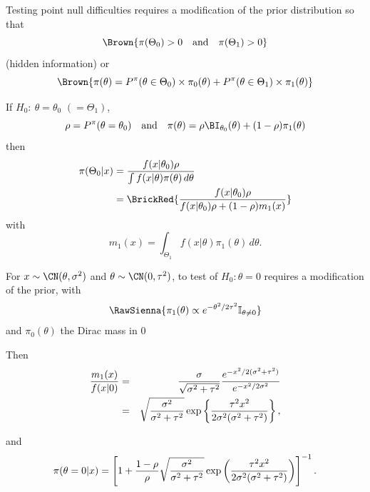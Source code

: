 \begin{slide}
\end{slide}\begin{slide}

Testing point null difficulties requires a modification of the prior distribution
so that 
$$\Brown{
\pi(\Theta_0)>0 \quad\hbox{and}\quad \pi(\Theta_1)>0
}$$
(hidden information) or
$$\Brown{
\pi(\theta) = P^\pi (\theta\in\Theta_0)\times\pi_0(\theta) +
                P^\pi (\theta\in\Theta_1)\times\pi_1(\theta)
}$$


\pause
{}

\end{slide}\begin{slide}

If $H_0: \ \theta=\theta_0$ $(=\Theta_1)$, 
$$
\rho = P^\pi (\theta=\theta_0) \quad\hbox{and}\quad
\pi(\theta) = \rho \BI_{\theta_0}(\theta)+ (1-\rho) \pi_1(\theta)
$$
then
\begin{align*}
\pi(\Theta_0|x) &= {f(x|\theta_0)\rho \over 
		\int f(x|\theta)\pi(\theta)\,d\theta} \\
 &= \BrickRed{{f(x|\theta_0)\rho \over f(x|\theta_0)\rho + (1-\rho) m_1(x)}}
\end{align*}
with
$$
m_1(x)=\int_{\Theta_1} f(x|\theta)\pi_1(\theta)\,d\theta.
$$

\end{slide}\begin{slide}
 For $x\sim \CN(\theta,\sigma^2)$ and $\theta\sim\CN(0,\tau^2)$,
to test of $H_0:\theta=0$ requires a modification of the prior, with
$$\RawSienna{
\pi_1(\theta) \propto e^{-\theta^2/2\tau^2} \mathbb{I}_{\theta\ne 0}
}$$
and $\pi_0(\theta)$ the Dirac mass in $0$

\pause
Then
\begin{eqnarray*}
{m_1(x)\over f(x|0)} &=&  {\sigma\over \sqrt{\sigma^2+\tau^2}}
	{e^{-x^2/2(\sigma^2+\tau^2)} \over e^{-x^2/2\sigma^2}} \\
      &=&  \sqrt{{\sigma^2\over\sigma^2+\tau^2}} \exp\left\{
	   {\tau^2x^2\over 2\sigma^2(\sigma^2+\tau^2)} \right\}, 
\end{eqnarray*}
\fin

\end{slide}\begin{slide}
\debut[cont'd]
and
$$
\pi(\theta=0|x) = \left[ 1+{1-\rho\over \rho} \sqrt{{\sigma^2\over
\sigma^2+\tau^2}} \exp\left({\tau^2x^2\over 2\sigma^2(\sigma^2+\tau^2)}\right)
\right]^{-1}.
$$


\end{slide}
